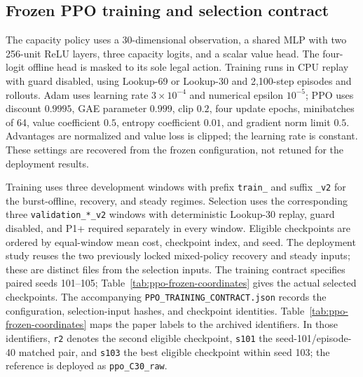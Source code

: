 \subsection{Frozen PPO training and selection contract}
\label{sec:ppo-training-contract}
The capacity policy uses a 30-dimensional observation, a shared MLP with
 two 256-unit ReLU layers, three capacity logits, and a scalar value head.
The four-logit offline head is masked to its sole legal action.
Training runs in CPU replay with guard disabled, using Lookup-69 or Lookup-30 and
2,100-step episodes and rollouts. Adam uses learning rate $3\times10^{-4}$
and numerical epsilon $10^{-5}$; PPO uses discount $0.9995$, GAE parameter
$0.999$, clip $0.2$, four update epochs, minibatches of 64, value coefficient
$0.5$, entropy coefficient $0.01$, and gradient norm limit $0.5$.
Advantages are normalized and value loss is clipped; the learning rate
is constant. These settings are recovered from the frozen configuration,
not retuned for the deployment results.

Training uses three development windows with prefix \texttt{train\_}
and suffix \texttt{\_v2} for the burst-offline, recovery, and steady regimes.
Selection uses the corresponding three \texttt{validation\_*\_v2} windows
with deterministic Lookup-30 replay, guard disabled, and P1+ required separately
in every window. Eligible checkpoints are ordered by equal-window mean
cost, checkpoint index, and seed. The deployment study reuses the two previously locked
mixed-policy recovery and steady inputs; these are distinct files from the
selection inputs. The training contract specifies paired seeds 101--105;
Table~\ref{tab:ppo-frozen-coordinates} gives the actual selected checkpoints.
The accompanying \texttt{PPO\_TRAINING\_CONTRACT.json} records the configuration,
selection-input hashes, and checkpoint identities.
Table~\ref{tab:ppo-frozen-coordinates} maps the paper labels to the archived
identifiers. In those identifiers, \texttt{r2} denotes the second eligible
checkpoint, \texttt{s101} the seed-101/episode-40 matched pair, and
\texttt{s103} the best eligible checkpoint within seed 103; the reference
is deployed as \texttt{ppo\_C30\_raw}.

